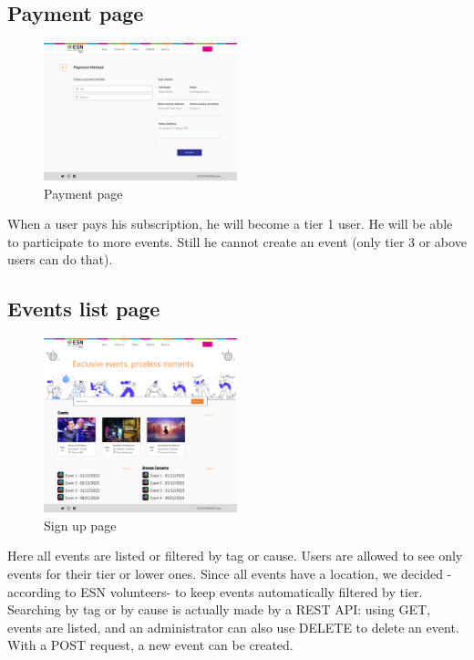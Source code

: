 \subsection{Payment page}
\begin{figure}[H]
    \centering
    \includegraphics[width=0.5\textwidth]{images/PaymentMethod.png}
    \caption{Payment page}
    \label{fig:payment}
\end{figure}
When a user pays his subscription, he will become a tier 1 user. He will be able to participate to more
events. Still he cannot create an event (only tier 3 or above users can do that). 
\subsection{Events list page}
\begin{figure}[H]
    \centering
    \includegraphics[width=0.5\textwidth]{images/EventList.png}
    \caption{Sign up page}
    \label{fig:events}
\end{figure}
Here all events are listed or filtered by tag or cause. Users are allowed to see only events for their tier
or lower ones. Since all events have a location, we decided -according to ESN volunteers- to keep
events automatically filtered by tier.\\
Searching by tag or by cause is actually made by a REST API: using GET, events are listed, and an administrator
can also use DELETE to delete an event. With a POST request, a new event can be created.\\
